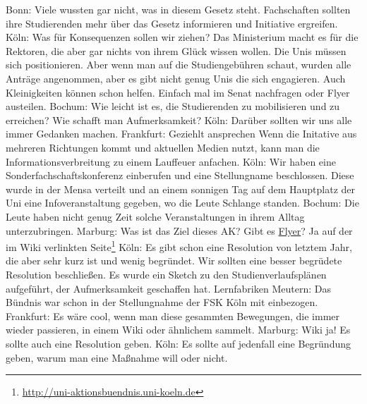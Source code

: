 \begin{outline}
        \1 Bonn: Viele wussten gar nicht, was in diesem Gesetz steht. Fachschaften sollten ihre Studierenden mehr über das Gesetz informieren und Initiative ergreifen.
        \1 Köln: Was für Konsequenzen sollen wir ziehen? Das Ministerium macht es für die Rektoren, die aber gar nichts von ihrem Glück wissen wollen. Die Unis müssen sich positionieren. Aber wenn man auf die Studiengebühren schaut, wurden alle Anträge angenommen, aber es gibt nicht genug Unis die sich engagieren. Auch Kleinigkeiten können schon helfen. Einfach mal im Senat nachfragen oder Flyer austeilen.
        \1 Bochum: Wie leicht ist es, die Studierenden zu mobilisieren und zu erreichen? Wie schafft man Aufmerksamkeit?
        \2 Köln: Darüber sollten wir uns alle immer Gedanken machen.
        \2 Frankfurt: Geziehlt ansprechen
        \2 Wenn die Initative aus mehreren Richtungen kommt und aktuellen Medien nutzt, kann man die Informationsverbreitung zu einem Lauffeuer anfachen.
        \1 Köln: Wir haben eine Sonderfachschaftskonferenz einberufen und eine Stellungname beschlossen. Diese wurde in der Mensa verteilt und an einem sonnigen Tag auf dem Hauptplatz der Uni eine Infoveranstaltung gegeben, wo die Leute Schlange standen.
        \2 Bochum: Die Leute haben nicht genug Zeit solche Veranstaltungen in ihrem Alltag unterzubringen.
        \1 Marburg: Was ist das Ziel dieses AK?
        \1 Gibt es \underline{Flyer}? Ja auf der im Wiki verlinkten Seite\footnote{\url{http://uni-aktionsbuendnis.uni-koeln.de}}
        \1 Köln: Es gibt schon eine Resolution von letztem Jahr, die aber sehr kurz ist und wenig begründet. Wir sollten eine besser begrüdete Resolution beschließen.
        \1 Es wurde ein Sketch zu den Studienverlaufsplänen aufgeführt, der Aufmerksamkeit geschaffen hat.
        \1 Lernfabriken Meutern: Das Bündnis war schon in der Stellungnahme der FSK Köln mit einbezogen.
        \1 Frankfurt: Es wäre cool, wenn man diese gesammten Bewegungen, die immer wieder passieren, in einem Wiki oder ähnlichem sammelt.
        \1 Marburg: Wiki ja! Es sollte auch eine Resolution geben.
        \1 Köln: Es sollte auf jedenfall eine Begründung geben, warum man eine Maßnahme will oder nicht.
      \end{outline}

